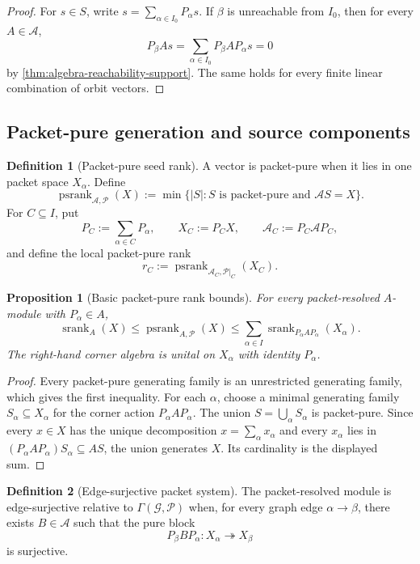 \documentclass[11pt]{article}
\newtheorem{proposition}[proposition]{Proposition}
\theoremstyle{definition}
\newtheorem{definition}[definition]{Definition}
\theoremstyle{remark}
\theoremstyle{definition}\newtheorem{example}[theorem]{Example}
\newcommand{\A}{\mathcal A}
\newcommand{\Pcal}{\mathcal P}
\newcommand{\srank}{\operatorname{srank}}
\newcommand{\psrank}{\operatorname{psrank}}
\newcommand{\RecordID}[1]{\label{record:#1}}
\newcommand{\Depends}[1]{}
\begin{document}
\begin{proof}
For $s\in S$, write $s=\sum_{\alpha\in I_0}P_\alpha s$.  If $\beta$ is unreachable from $I_0$, then for every $A\in\A$,
\[
P_\beta As
=
\sum_{\alpha\in I_0}P_\beta AP_\alpha s
=0
\]
by \cref{thm:algebra-reachability-support}.  The same holds for every finite linear combination of orbit vectors.
\end{proof}

\subsection{Packet-pure generation and source components}
\begin{definition}[Packet-pure seed rank]
\label{def:directed-seed-rank}
A vector is packet-pure when it lies in one packet space $X_\alpha$.  Define
\[
\psrank_{\A,\Pcal}(X)
:=
\min\{|S|:S\text{ is packet-pure and }\A S=X\}.
\]
For $C\subseteq I$, put
\[
P_C:=\sum_{\alpha\in C}P_\alpha,
\qquad
X_C:=P_CX,
\qquad
\A_C:=P_C\A P_C,
\]
and define the local packet-pure rank
\[
r_C:=\psrank_{\A_C,\Pcal|_C}(X_C).
\]
\end{definition}
\RecordID{PSC-I-D-DIRECTED-SEED-RANK}

\begin{proposition}[Basic packet-pure rank bounds]
\label{prop:packet-pure-rank-bounds}
For every packet-resolved $A$-module with $P_\alpha\in A$,
\[
\boxed{
\srank_A(X)
\leq
\psrank_{A,\Pcal}(X)
\leq
\sum_{\alpha\in I}
\srank_{P_\alpha A P_\alpha}(X_\alpha).
}
\]
The right-hand corner algebra is unital on $X_\alpha$ with identity $P_\alpha$.
\end{proposition}
\RecordID{PSC-I-P-PACKET-PURE-RANK-BOUNDS}
\Depends{PSC-I-D-SEED-RANK and PSC-I-D-DIRECTED-SEED-RANK.}

\begin{proof}
Every packet-pure generating family is an unrestricted generating family, which gives the first inequality.  For each $\alpha$, choose a minimal generating family $S_\alpha\subseteq X_\alpha$ for the corner action $P_\alpha A P_\alpha$.  The union $S=\bigcup_\alpha S_\alpha$ is packet-pure.  Since every $x\in X$ has the unique decomposition $x=\sum_\alpha x_\alpha$ and every $x_\alpha$ lies in $(P_\alpha A P_\alpha)S_\alpha\subseteq AS$, the union generates $X$.  Its cardinality is the displayed sum.
\end{proof}

\begin{definition}[Edge-surjective packet system]
\label{def:edge-surjective}
The packet-resolved module is edge-surjective relative to $\Gamma(\mathcal G,\Pcal)$ when, for every graph edge $\alpha\to\beta$, there exists $B\in\A$ such that the pure block
\[
P_\beta BP_\alpha:X_\alpha\twoheadrightarrow X_\beta
\]
is surjective.
\end{definition}
\RecordID{PSC-I-D-EDGE-SURJECTIVE}
\end{document}
